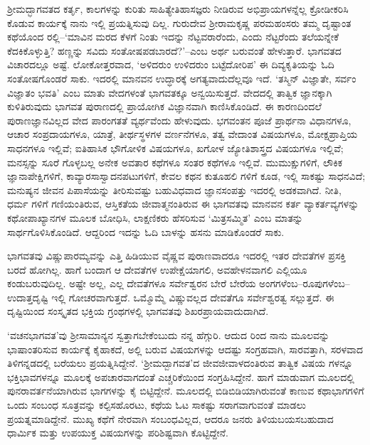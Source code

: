 ಶ್ರೀಮದ್ಭಾಗವತದ ಕರ್ತೃ, ಕಾಲಗಳನ್ನು ಕುರಿತು ಸಾಹಿತ್ಯೇತಿಹಾಸಜ್ಞರು ನೀಡಿರುವ ಅಭಿಪ್ರಾಯಗಳನ್ನೆಲ್ಲ ಕ್ರೋಡೀಕರಿಸಿ ಕೊಡುವ ಕಾರ್ಯಕ್ಕೆ ನಾನು ಇಲ್ಲಿ ಪ್ರಯತ್ನಿಸುವು ದಿಲ್ಲ. ಗುರುದೇವ ಶ್ರೀರಾಮಕೃಷ್ಣ ಪರಮಹಂಸರು ತಮ್ಮ ದೃಷ್ಟಾಂತ ಕಥೆಯೊಂದ ರಲ್ಲಿ–‘ಮಾವಿನ ಮರದ ಕೆಳಗೆ ನಿಂತು ಇದನ್ನು ನೆಟ್ಟವರಾರೆಂದು, ಎಂದು ನೆಟ್ಟರೆಂದು ತಲೆಯನ್ನೇಕೆ ಕೆದಕಿಕೊಳ್ಳುತ್ತಿ? ಹಣ್ಣನ್ನು ಸವಿದು ಸಂತೋಷಪಡಬಾರದೆ?’–ಎಂಬ ಅರ್ಥ ಬರುವಂತೆ ಹೇಳುತ್ತಾರೆ. ಭಾಗವತದ ವಿಚಾರದಲ್ಲೂ ಅಷ್ಟೆ. ಲೋಕೋತ್ತರವಾದ, ‘ಅಳಿದರುಂ ಉಳಿದರುಂ ಬಟ್ಟೆದೋರಿಪ’ ಈ ದಿವ್ಯಕೃತಿಯನ್ನು ಓದಿ ಸಂತೋಷಗೊಂಡರೆ ಸಾಕು. ಇದರಲ್ಲಿ ಮಾನವನ ಉದ್ಧಾರಕ್ಕೆ ಅಗತ್ಯವಾದುದೆಲ್ಲವೂ ಇದೆ. ‘ತಸ್ಮಿನ್ ವಿಜ್ಞಾತೇ, ಸರ್ವಂ ವಿಜ್ಞಾತಂ ಭವತಿ’ ಎಂಬ ಮಾತು ವೇದಗಳಂತೆ ಭಾಗವತಕ್ಕೂ ಅನ್ವಯಿಸುತ್ತದೆ. ವೇದದಲ್ಲಿ ತಾತ್ವಿಕ ಜ್ಞಾನಕ್ಕಾಗಿ ಕುಳಿತಿರುವುದು ಭಾಗವತ ಪುರಾಣದಲ್ಲಿ ಪ್ರಾಯೋಗಿಕ ವಿಜ್ಞಾನವಾಗಿ ಕಾಣಿಸಿಕೊಂಡಿದೆ. ಈ ಕಾರಣದಿಂದಲೆ ಪುರಾಣಜ್ಞಾನವಿಲ್ಲದ ವೇದ ಪಾರಂಗತತೆ ವ್ಯರ್ಥವೆಂದು ಹೇಳುವುದು. ಭಗವಂತನ ಪೂಜೆ ಪ್ರಾರ್ಥನಾ ವಿಧಾನಗಳೂ, ಆಚಾರ ಸಂಪ್ರದಾಯಗಳೂ, ಯಾತ್ರೆ, ತೀರ್ಥಸ್ಥಳಗಳ ವರ್ಣನೆಗಳೂ, ತತ್ವ ವೇದಾಂತ ವಿಷಯಗಳೂ, ಮೋಕ್ಷಪ್ರಾಪ್ತಿಯ ಸಾಧನಗಳೂ ಇಲ್ಲಿವೆ; ಐತಿಹಾಸಿಕ ಭೌಗೋಳಿಕ ವಿಷಯಗಳೂ, ಖಗೋಳ ಜ್ಯೋತಿಶಾಸ್ತ್ರದ ವಿಷಯಗಳೂ ಇಲ್ಲಿವೆ; ಮನಸ್ಸನ್ನು ಸೂರೆ ಗೊಳ್ಳಬಲ್ಲ ಅನೇಕ ಅವತಾರ ಕಥೆಗಳೂ ಸಂತರ ಕಥೆಗಳೂ ಇಲ್ಲಿವೆ. ಮುಮುಕ್ಷುಗಳಿಗೆ, ಲೌಕಿಕ ಜ್ಞಾನಾಪೇಕ್ಷಿಗಳಿಗೆ, ಕಾವ್ಯಾರಸಾಸ್ವಾದನಪಟುಗಳಿಗೆ, ಕೇವಲ ಕಥನ ಕುತೂಹಲಿ ಗಳಿಗೆ ಕೂಡ, ಇಲ್ಲಿ ಸಾಕಷ್ಟು ಸಾಧನವಿದೆ; ಮನುಷ್ಯನ ಜೀವನ ಪಿಪಾಸೆಯನ್ನು ತೀರಿಸುವಷ್ಟು ಬಹುವಿಧವಾದ ಜ್ಞಾನಸಂಪತ್ತು ಇದರಲ್ಲಿ ಅಡಕವಾಗಿದೆ. ನೀತಿ, ಧರ್ಮ ಗಳಿಗೆ ಗಣಿಯಂತಿರುವ, ಆಸ್ತಿಕತೆಯ ಜೀವಾತ್ಮನಂತಿರುವ ಈ ಭಾಗವತವು ಮಾನವನ ಕರ್ತ ವ್ಯಾಕರ್ತವ್ಯಗಳನ್ನು ಕಥೋಪಾಖ್ಯಾನಗಳ ಮೂಲಕ ಬೋಧಿಸಿ, ಲಾಕ್ಷಣಿಕರು ಹೆಸರಿಸುವ ‘ಮಿತ್ರಸಮ್ಮಿತ’ ಎಂಬ ಮಾತನ್ನು ಸಾರ್ಥಗೊಳಿಸಿಕೊಂಡಿದೆ. ಆದ್ದರಿಂದ ಇದನ್ನು ಓದಿ ಬಾಳನ್ನು ಹಸನು ಮಾಡಿಕೊಂಡರೆ ಸಾಕು.

ಭಾಗವತವು ವಿಷ್ಣುಪಾರಮ್ಯವನ್ನು ಎತ್ತಿ ಹಿಡಿಯುವ ವೈಷ್ಣವ ಪುರಾಣವಾದರೂ ಇದರಲ್ಲಿ ಇತರ ದೇವತೆಗಳ ಪ್ರಸಕ್ತಿ ಬರದೆ ಹೋಗಿಲ್ಲ. ಹಾಗೆ ಬಂದಾಗ ಆ ದೇವತೆಗಳ ಉಪೇಕ್ಷೆಯಾಗಲಿ, ಅವಹೇಳನವಾಗಲಿ ಎಲ್ಲಿಯೂ ಕಂಡುಬರುವುದಿಲ್ಲ. ಅಷ್ಟೇ ಅಲ್ಲ, ಎಲ್ಲ ದೇವತೆಗಳೂ ಸರ್ವೇಶ್ವರನ ಬೇರೆ ಬೇರೆಯ ಅಂಗಗಳೆಂಬ–ರೂಪುಗಳೆಂಬ– ಉದಾತ್ತದೃಷ್ಟಿ ಇಲ್ಲಿ ಗೋಚರವಾಗುತ್ತದೆ. ಒಮ್ಮೊಮ್ಮೆ ವಿಷ್ಣುವಲ್ಲದ ದೇವತೆಗೂ ಸರ್ವೇಶ್ವರತ್ವ ಸಲ್ಲುತ್ತದೆ. ಈ ದೃಷ್ಟಿಯಿಂದ ಸಂಸ್ಕೃತದ ಭಕ್ತಿಯ ಗ್ರಂಥಗಳಲ್ಲಿ ಭಾಗವತವು ಶಿಖರಪ್ರಾಯವಾದುದಾಗಿದೆ.

‘ವಚನಭಾಗವತ’ವು ಶ್ರೀಸಾಮಾನ್ಯನ ಸ್ವತ್ತಾಗಬೇಕೆಂಬುದು ನನ್ನ ಹೆಗ್ಗುರಿ. ಆದುದ ರಿಂದ ನಾನು ಮೂಲವನ್ನು ಭಾಷಾಂತರಿಸುವ ಕಾರ್ಯಕ್ಕೆ ಕೈಹಾಕದೆ, ಅಲ್ಲಿ ಬರುವ ವಿಷಯಗಳನ್ನು ಆದಷ್ಟು ಸಂಗ್ರಹವಾಗಿ, ಸಾರವತ್ತಾಗಿ, ಸರಳವಾದ ತಿಳಿಗನ್ನಡದಲ್ಲಿ ಬರೆಯಲು ಪ್ರಯತ್ನಿಸಿದ್ದೇನೆ. ‘ಶ್ರೀಮದ್ಬಾಗವತ’ದ ಜೀವಜೀವಾಳದಂತಿರುವ ತಾತ್ವಿಕ ವಿಷಯ ಗಳನ್ನೂ ಭಕ್ತಿಭಾವಗಳನ್ನೂ ಮೂಲಕ್ಕೆ ಅಪಚಾರವಾಗದಂತೆ ಎಚ್ಚರಿಕೆಯಿಂದ ಸಂಗ್ರಹಿಸಿದ್ದೇನೆ. ಹಾಗೆ ಮಾಡುವಾಗ ಮೂಲದಲ್ಲಿ ಪುನರಾವರ್ತನೆಯಾಗಿರುವ ಭಾಗಗಳನ್ನು ಕೈ ಬಿಟ್ಟಿದ್ದೇನೆ. ಮೂಲದಲ್ಲಿ ಬಿಡಿಬಿಡಿಯಾಗಿರುವಂತೆ ಕಾಣುವ ಕಥಾಭಾಗಗಳಿಗೆ ಒಂದು ಸಂಬಂಧ ಸೂತ್ರವನ್ನು ಕಲ್ಪಿಸಹೊರಟು, ಕಥೆಯ ಓಟ ಸಾಕಷ್ಟು ಸರಾಗವಾಗುವಂತೆ ಮಾಡಲು ಪ್ರಯತ್ನಮಾಡಿದ್ದೇನೆ. ಮುಖ್ಯ ಕಥೆಗೆ ನೇರವಾಗಿ ಸಂಬಂಧವಿಲ್ಲದ, ಆದರೂ ಜನರು ತಿಳಿಯಬಯಸಬಹುದಾದ ಧಾರ್ಮಿಕ ಮತ್ತು ಉಪಯುಕ್ತ ವಿಷಯಗಳನ್ನು ಪರಿಶಿಷ್ಟವಾಗಿ ಕೊಟ್ಟಿದ್ದೇನೆ.

